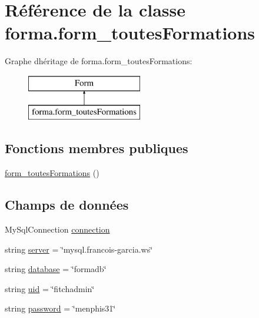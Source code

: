 \hypertarget{classforma_1_1form__toutes_formations}{}\section{Référence de la classe forma.\+form\+\_\+toutes\+Formations}
\label{classforma_1_1form__toutes_formations}
Graphe d\textquotesingle{}héritage de forma.\+form\+\_\+toutes\+Formations\+:\begin{figure}[H]
\begin{center}
\leavevmode
\includegraphics[height=2.000000cm]{classforma_1_1form__toutes_formations}
\end{center}
\end{figure}
\subsection*{Fonctions membres publiques}
\begin{DoxyCompactItemize}
\item 
\hyperlink{classforma_1_1form__toutes_formations_ae8592befa5550e5afeeff75e3010a01a}{form\+\_\+toutes\+Formations} ()
\end{DoxyCompactItemize}
\subsection*{Champs de données}
\begin{DoxyCompactItemize}
\item 
My\+Sql\+Connection \hyperlink{classforma_1_1form__toutes_formations_a60b5bb6247f3b5c39578fd1c7ae94065}{connection}
\item 
string \hyperlink{classforma_1_1form__toutes_formations_ac2fc023d0d173de0a3fee821eb67a8d2}{server} = \char`\"{}mysql.\+francois-\/garcia.\+ws\char`\"{}
\item 
string \hyperlink{classforma_1_1form__toutes_formations_a98d34a04cf5782072491ce875cd01902}{database} = \char`\"{}formadb\char`\"{}
\item 
string \hyperlink{classforma_1_1form__toutes_formations_ab7b6eb3fd620befc4e18ba3056a7b3ca}{uid} = \char`\"{}fitchadmin\char`\"{}
\item 
string \hyperlink{classforma_1_1form__toutes_formations_ade448b74ca6e712653ee666380c9e4b1}{password} = \char`\"{}menphis31\char`\"{}
\end{DoxyCompactItemize}
